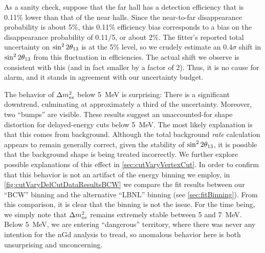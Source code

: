 \documentclass[../thesis.tex]{subfiles}
\begin{document}
As a sanity check, suppose that the far hall has a detection efficiency that is 0.11\% lower than that of the near halls. Since the near-to-far disappearance probability is about 5\%, this 0.11\% efficiency bias corresponds to a bias on the disappearance probability of 0.11/5, or about 2\%. The fitter's reported total uncertainty on $\sin^2 2\theta_{13}$ is at the 5\% level, so we crudely estimate an $0.4\sigma$ shift in $\sin^2 2\theta_{13}$ from this fluctuation in efficiencies. The actual shift we observe is consistent with this (and in fact smaller by a factor of 2). Thus, it is no cause for alarm, and it stands in agreement with our uncertainty budget.
% 

The behavior of $\Delta m^2_{ee}$ below 5~MeV is surprising: There is a significant downtrend, culminating at approximately a third of the uncertainty. Moreover, two ``bumps'' are visible. These results suggest an unaccounted-for shape distortion for delayed-energy cuts below 5~MeV. The most likely explanation is that this comes from background. Although the total background \emph{rate} calculation appears to remain generally correct, given the stability of $\sin^2 2\theta_{13}$, it is possible that the background shape is being treated incorrectly. We further explore possible explanations of this effect in \autoref{sec:cutVaryVertexCut}. In order to confirm that this behavior is not an artifact of the energy binning we employ, in \autoref{fig:cutVaryDelCutDataResultsBCW} we compare the fit results between our ``BCW'' binning and the alternative ``LBNL'' binning (see \autoref{sec:fitBinning}). From this comparison, it is clear that the binning is not the issue. For the time being, we simply note that $\Delta m^2_{ee}$ remains extremely stable between 5 and 7~MeV. Below 5~MeV, we are entering ``dangerous'' territory, where there was never any intention for the nGd analysis to tread, so anomalous behavior here is both unsurprising and unconcerning.
\end{document}
